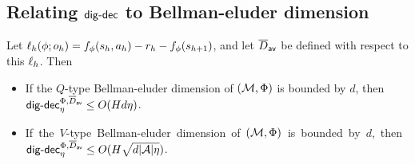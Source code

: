 \subsection{Relating $\mathsf{dig}\text{-}\mathsf{dec}$ to Bellman-eluder dimension}\label{app: sto Be}
\begin{lemma}\label{lem: bound Q type BE} 
    Let $\ell_h(\phi; o_h) = f_\phi(s_h,a_h) - r_h - f_\phi(s_{h+1})$, and let $\overline{D}_{\mathsf{av}}$ be defined with respect to this $\ell_h$. Then 
    \begin{itemize}[leftmargin=1em, nosep]
 \setlength{\itemsep}{0pt} %
    \setlength{\parskip}{0pt} 
    \setlength{\topsep}{0pt}
        \item If the $Q$-type Bellman-eluder dimension of $(\mathcal{M},\Phi)$ is bounded by $d$, then $\mathsf{dig}\text{-}\mathsf{dec}_\eta^{\Phi, \overline{D}_{\mathsf{av}}}\leq O(Hd\eta)$. 
        \item \mbox{If the $V$-type Bellman-eluder dimension of $(\mathcal{M},\Phi)$ is bounded by $d$, then $\mathsf{dig}\text{-}\mathsf{dec}_\eta^{\Phi, \overline{D}_{\mathsf{av}}}\leq O(H\sqrt{d|\mathcal{A}|\eta })$.} 
    \end{itemize}
     
\end{lemma}
